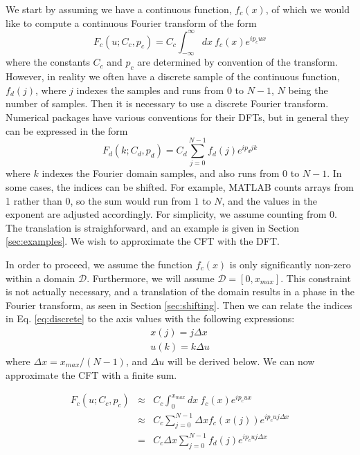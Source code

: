 \documentclass{article}
\begin{document}
We start by assuming we have a continuous function, $f_c(x)$, of which we would like to compute a continuous Fourier transform of the form
\begin{equation}
\label{eq:continuous}
F_c(u;C_c,p_c)=C_c\int_{-\infty}^{\infty}dx \ f_c(x) e^{i p_c u x}
\end{equation}
where the constants $C_c$ and $p_c$ are determined by convention of the transform.  However, in reality we often have a discrete sample of the continuous function, $f_d(j)$, where $j$ indexes the samples and runs from $0$ to $N-1$, $N$ being the number of samples.  Then it is necessary to use a discrete Fourier transform.  Numerical packages have various conventions for their DFTs, but in general they can be expressed in the form
\begin{equation}
\label{eq:discrete}
F_d(k;C_d,p_d)=C_d\sum\limits_{j=0}^{N-1}f_d(j)e^{i p_d j k}
\end{equation}
where $k$ indexes the Fourier domain samples, and also runs from $0$ to $N-1$.  In some cases, the indices can be shifted.  For example, MATLAB counts arrays from 1 rather than 0, so the sum would run from $1$ to $N$, and the values in the exponent are adjusted accordingly.  For simplicity, we assume counting from 0.  The translation is straighforward, and an example is given in Section \ref{sec:examples}.  We wish to approximate the CFT with the DFT.

In order to proceed, we assume the function $f_c(x)$ is only significantly non-zero within a domain $\mathcal{D}$.  Furthermore, we will assume $\mathcal{D}=[0,x_{max}]$.  This constraint is not actually necessary, and a translation of the domain results in a phase in the Fourier transform, as seen in Section \ref{sec:shifting}.  Then we can relate the indices in Eq. \eqref{eq:discrete} to the axis values with the following expressions:
\begin{subequations}
\label{eq:axes}
\begin{align}
x(j)=j\Delta x \label{eq:x_axis}\\
u(k)=k\Delta u \label{eq:u_axis}
\end{align}
\end{subequations}
where $\Delta x = x_{max}/(N-1)$, and $\Delta u$ will be derived below.  We can now approximate the CFT with a finite sum.

\begin{eqnarray}
\label{eq:approx_cont}
F_c(u;C_c,p_c) 	& \approx	&	C_c\int_0 ^{x_{max}} dx \ f_c(x)e^{i p_c u x} \nonumber \\
								& \approx	&	C_c\sum\limits_{j=0}^{N-1}\Delta x f_c(x(j))e^{i p_c u j \Delta x} \nonumber \\
								& =				&	C_c \Delta x \sum\limits_{j=0}^{N-1} f_d(j) e^{i p_c u j \Delta x}
\end{eqnarray}
\end{document}
